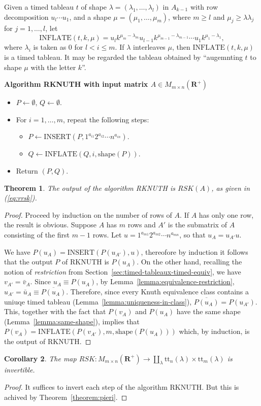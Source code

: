 \documentclass[12pt]{amsart}
\newtheorem{theorem}{Theorem}[subsection]
\newtheorem{corollary}[theorem]{Corollary}
\theoremstyle{definition}
\newcommand{\ins}{\mathrm{INSERT}}
\newcommand{\shape}{\mathrm{shape}}
\newcommand{\ttab}{\mathrm{tt}}
\newcommand{\RR}{\mathbf R}
\newcommand{\ot}{\leftarrow}
\newcommand{\infl}{\mathrm{INFLATE}}
\begin{document}
Given a timed tableau $t$ of shape $\lambda=(\lambda_1,\dotsc,\lambda_l)$ in $A_{k-1}$ with row decomposition $u_l\dotsb u_1$, and a shape $\mu=(\mu_1,\dotsc,\mu_m)$, where $m\geq l$ and $\mu_j\geq \lambda \lambda_j$ for $j=1,\dotsc,l$, let
\begin{displaymath}
  \infl(t,k,\mu)=u_l k^{\mu_m-\lambda_m} u_{l-1} k^{\mu_{m-1}-\lambda_{m-1}} \dotsb u_1 k^{\mu_1-\lambda_1},
\end{displaymath}
where $\lambda_i$ is taken as $0$ for $l<i\leq m$.
If $\lambda$ interleaves $\mu$, then $\infl(t,k,\mu)$ is a timed tableau.
It may be regarded the tableau obtained by ``augemnting $t$ to shape $\mu$ with the letter $k$''.

\begin{center}
  \textbf{Algorithm RKNUTH with input matrix $A\in M_{m\times n}(\RR^+)$}
\end{center}
\begin{itemize}
\item $P\ot \emptyset$, $Q\ot \emptyset$.
\item For $i=1,\dotsc,m$, repeat the following steps:
  \begin{itemize}
  \item $P\ot \ins(P, 1^{a_{i1}}2^{a_{i2}}\dotsb n^{a_{in}})$.
  \item $Q\ot \infl(Q, i,\shape(P))$.
  \end{itemize}
\item Return $(P, Q)$.
\end{itemize}


\begin{theorem}
  The output of the algorithm RKNUTH is $RSK(A)$, as given in (\ref{eq:rrsk}).
\end{theorem}
\begin{proof}
  Proceed by induction on the number of rows of $A$.
  If $A$ has only one row, the result is obvious.
  Suppose $A$ has $m$ rows and $A'$ is the submatrix of $A$ consisting of the first $m-1$ rows.
  Let $u=1^{a_{m1}}2^{a_{m2}}\dotsb n^{a_{mn}}$, so that $u_A=u_{A'}u$. 

  We have $P(u_A)=\ins(P(u_{A'}), u)$, thereofore by induction it follows that the output $P$ of RKNUTH is $P(u_A)$.
  On the other hand, recalling the notion of \emph{restriction} from Section~\ref{sec:timed-tableaux-timed-equiv}, we have $v_{A'}=\bar v_A$.
  Since $u_A\equiv P(u_A)$, by Lemma~\ref{lemma:equivalence-restriction}, $u_{A'}=\bar u_A \equiv \overline{P(u_A)}$.
  Therefore, since every Knuth equivalence class contains a uniuqe timed tableau (Lemma~\ref{lemma:uniqueness-in-class}), $\overline{P(u_A)} = P(u_{A'})$.
  This, together with the fact that $P(v_A)$ and $P(u_A)$ have the same shape (Lemma~\ref{lemma:same-shape}), implies that $P(v_A)=\infl(P(v_{A'}),m,\shape(P(u_A)))$ which, by induction, is the output of RKNUTH.
\end{proof}
\begin{corollary}
  The map $RSK:M_{m\times n}(\RR^+)\to \coprod_\lambda \ttab_n(\lambda)\times \ttab_m(\lambda)$ is invertible.
\end{corollary}
\begin{proof}
  It suffices to invert each step of the algorithm RKNUTH.
  But this is achived by Theorem~\ref{theorem:pieri}.
\end{proof}
\end{document}
